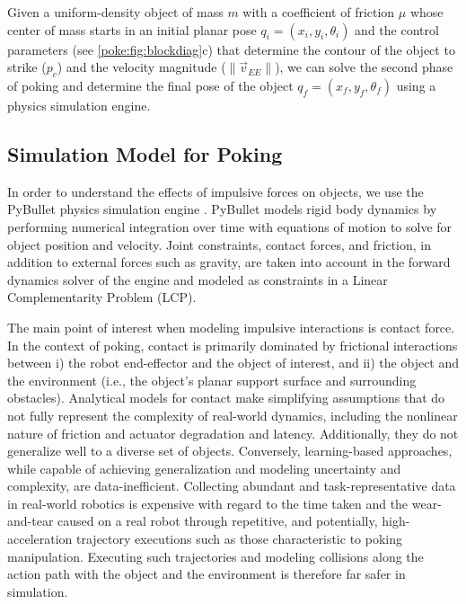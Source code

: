 Given a uniform-density object of mass $m$ with a coefficient of friction $\mu$ whose center of mass starts in an initial planar pose $q_i = (x_i, y_i, \theta_i)$ and the control parameters (see \cref{poke:fig:blockdiag}c) that determine the contour of the object to strike ($p_c$) and the velocity magnitude ($\|\vec{v}_{EE}\|$), we can solve the second phase of poking and determine the final pose of the object $q_f = (x_f, y_f, \theta_f)$ using a physics simulation engine.

\subsection{Simulation Model for Poking}
\label{sec:poking:context}

In order to understand the effects of impulsive forces on objects, we use the PyBullet physics simulation engine \cite{coumans2019}. PyBullet models rigid body dynamics by performing numerical integration over time with equations of motion to solve for object position and velocity. Joint constraints, contact forces, and friction, in addition to external forces such as gravity, are taken into account in the forward dynamics solver of the engine and modeled as constraints in a Linear Complementarity Problem (LCP).

The main point of interest when modeling impulsive interactions is contact force. In the context of poking, contact is primarily dominated by frictional interactions between i) the robot end-effector and the object of interest, and ii) the object and the environment (i.e., the object's planar support surface and surrounding obstacles). Analytical models for contact make simplifying assumptions that do not fully represent the complexity of real-world dynamics, including the nonlinear nature of friction and actuator degradation and latency. Additionally, they do not generalize well to a diverse set of objects.
Conversely, learning-based approaches, while capable of achieving generalization and modeling uncertainty and complexity, are data-inefficient. Collecting abundant and task-representative data in real-world robotics is expensive with regard to the time taken and the wear-and-tear caused on a real robot through repetitive, and potentially, high-acceleration trajectory executions such as those characteristic to poking manipulation. Executing such trajectories and modeling collisions along the action path with the object and the environment is therefore far safer in simulation.

